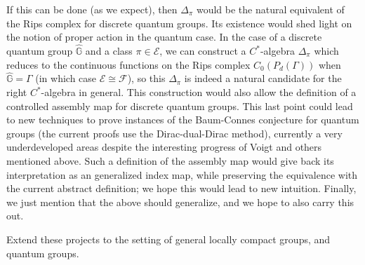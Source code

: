 If this can be done (as we expect), then $\Delta_\pi$ would be the natural equivalent of the Rips complex for discrete quantum groups. Its existence would shed light on the notion of proper action in the quantum case. In the case of a discrete quantum group $\hat{\mathbb G}$ and a class $\pi\in \mathcal E$, we can construct a $C^*$-algebra $\Delta_\pi$ which reduces to the continuous functions on the Rips complex $C_0(P_d(\Gamma))$ when $\hat{\mathbb G}= \Gamma$ (in which case $\mathcal E\cong \mathcal F$), so this $\Delta_\pi$ is indeed a natural candidate for the right $C^*$-algebra in general. This construction would also allow the definition of a controlled assembly map for discrete quantum groups. This last point could lead to new techniques to prove instances of the Baum-Connes conjecture for quantum groups (the current proofs use the Dirac-dual-Dirac method), currently a very underdeveloped areas despite the interesting progress of Voigt and others mentioned above. Such a definition of the assembly map would give back its interpretation as an generalized index map, while preserving the equivalence with the current abstract definition; we hope this would lead to new intuition. %
Finally, we just mention that the above should generalize, and we hope to also carry this out.

\begin{project} Extend these projects to the setting of general locally compact groups, and quantum groups.
\end{project}
